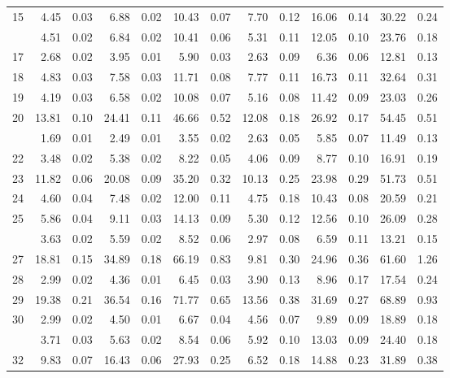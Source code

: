 \begin{tabular}[t]{rrrrrrrrrrrrr}
15 & 4.45 & 0.03 & 6.88 & 0.02 & 10.43 & 0.07 & 7.70 & 0.12 & 16.06 & 0.14 & 30.22 & 0.24\\
\addlinespace
16 & 4.51 & 0.02 & 6.84 & 0.02 & 10.41 & 0.06 & 5.31 & 0.11 & 12.05 & 0.10 & 23.76 & 0.18\\
17 & 2.68 & 0.02 & 3.95 & 0.01 & 5.90 & 0.03 & 2.63 & 0.09 & 6.36 & 0.06 & 12.81 & 0.13\\
18 & 4.83 & 0.03 & 7.58 & 0.03 & 11.71 & 0.08 & 7.77 & 0.11 & 16.73 & 0.11 & 32.64 & 0.31\\
19 & 4.19 & 0.03 & 6.58 & 0.02 & 10.08 & 0.07 & 5.16 & 0.08 & 11.42 & 0.09 & 23.03 & 0.26\\
20 & 13.81 & 0.10 & 24.41 & 0.11 & 46.66 & 0.52 & 12.08 & 0.18 & 26.92 & 0.17 & 54.45 & 0.51\\
\addlinespace
21 & 1.69 & 0.01 & 2.49 & 0.01 & 3.55 & 0.02 & 2.63 & 0.05 & 5.85 & 0.07 & 11.49 & 0.13\\
22 & 3.48 & 0.02 & 5.38 & 0.02 & 8.22 & 0.05 & 4.06 & 0.09 & 8.77 & 0.10 & 16.91 & 0.19\\
23 & 11.82 & 0.06 & 20.08 & 0.09 & 35.20 & 0.32 & 10.13 & 0.25 & 23.98 & 0.29 & 51.73 & 0.51\\
24 & 4.60 & 0.04 & 7.48 & 0.02 & 12.00 & 0.11 & 4.75 & 0.18 & 10.43 & 0.08 & 20.59 & 0.21\\
25 & 5.86 & 0.04 & 9.11 & 0.03 & 14.13 & 0.09 & 5.30 & 0.12 & 12.56 & 0.10 & 26.09 & 0.28\\
\addlinespace
26 & 3.63 & 0.02 & 5.59 & 0.02 & 8.52 & 0.06 & 2.97 & 0.08 & 6.59 & 0.11 & 13.21 & 0.15\\
27 & 18.81 & 0.15 & 34.89 & 0.18 & 66.19 & 0.83 & 9.81 & 0.30 & 24.96 & 0.36 & 61.60 & 1.26\\
28 & 2.99 & 0.02 & 4.36 & 0.01 & 6.45 & 0.03 & 3.90 & 0.13 & 8.96 & 0.17 & 17.54 & 0.24\\
29 & 19.38 & 0.21 & 36.54 & 0.16 & 71.77 & 0.65 & 13.56 & 0.38 & 31.69 & 0.27 & 68.89 & 0.93\\
30 & 2.99 & 0.02 & 4.50 & 0.01 & 6.67 & 0.04 & 4.56 & 0.07 & 9.89 & 0.09 & 18.89 & 0.18\\
\addlinespace
31 & 3.71 & 0.03 & 5.63 & 0.02 & 8.54 & 0.06 & 5.92 & 0.10 & 13.03 & 0.09 & 24.40 & 0.18\\
32 & 9.83 & 0.07 & 16.43 & 0.06 & 27.93 & 0.25 & 6.52 & 0.18 & 14.88 & 0.23 & 31.89 & 0.38\\
\bottomrule
\end{tabular}

